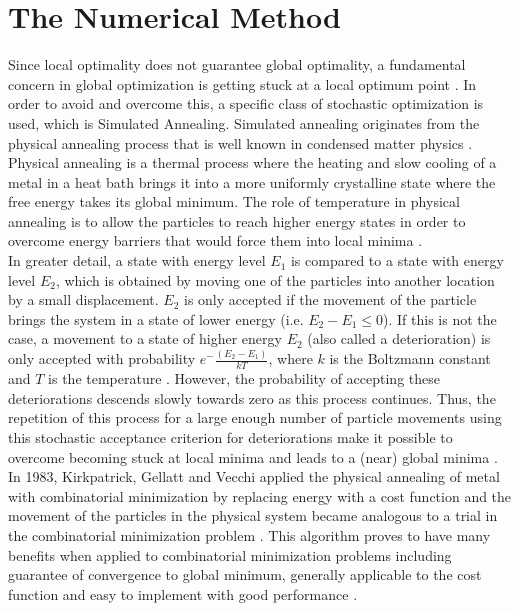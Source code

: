 \section{The Numerical Method}
\label{sec:related}


Since local optimality does not guarantee global optimality, a fundamental concern in global optimization is getting stuck at a local optimum point \cite{dekkers}. In order to avoid and overcome this, a specific class of stochastic optimization is used, which is Simulated Annealing. Simulated annealing originates from the physical annealing process that is well known in condensed matter physics \cite{dekkers}. Physical annealing is a thermal process where the heating and slow cooling of a metal in a heat bath brings it into a more uniformly crystalline state where the free energy takes its global minimum. The role of temperature in physical annealing is to allow the particles to reach higher energy states in order to overcome energy barriers that would force them into local minima \cite{neumaier}. \\
\hspace*{3mm}In greater detail, a state with energy level $E_1$ is compared to a state with energy level $E_2$, which is obtained by moving one of the particles into another location by a small displacement. $E_2$ is only accepted if the movement of the particle brings the system in a state of lower energy (i.e. $E_2-E_1\leq0$). If this is not the case, a movement to a state of higher energy $E_2$ (also called a deterioration) is only accepted with probability 
$e^-{\frac{(E_2-E_1)}{kT}}$, where $k$ is the Boltzmann constant and $T$ is the temperature \cite{dekkers}. However, the probability of accepting these deteriorations descends slowly towards zero as this process continues. Thus, the repetition of this process for a large enough number of particle movements using this stochastic acceptance criterion for deteriorations make it possible to overcome becoming stuck at local minima and leads to a (near) global minima \cite{dekkers}.\\
\hspace*{3mm}In 1983, Kirkpatrick, Gellatt and Vecchi applied the physical annealing of metal with combinatorial minimization by replacing energy with a cost function and the movement of the particles in the physical system became analogous to a trial in the combinatorial minimization problem \cite{dekkers}. This algorithm proves to have many benefits when applied to combinatorial minimization problems including guarantee of convergence to global minimum, generally applicable to the cost function and easy to implement with good performance \cite{dekkers}. \\
